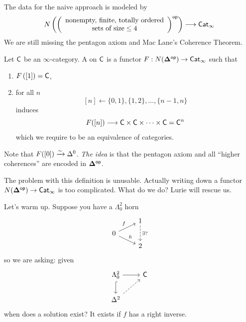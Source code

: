 	The data for the naive approach is modeled by
	\[
		N\left( \left(
				\begin{array}{c}
					\text{nonempty, finite, totally ordered} \\
					\text{sets of size} \le 4
		\end{array}\right) \op \right) \to \cat{Cat}_{\infty}
	\]
	We are still missing the pentagon axiom and Mac Lane's Coherence Theorem.

	\begin{definition}
		Let $\mathsf{C}$ be an $\infty$-category. A  on $\mathsf{C}$ is a functor
		$F:N(\bb{\Delta}\op)\to \cat{Cat}_\infty$ such that
	\begin{enumerate}[1)]
		\item $F\left( [1] \right) = \mathsf{C}$,
		\item for all $n $
			\[
				[n] \leftarrow \{0,1\} , \{1,2\} , \dots, \{n-1, n\}
			\]
			induces
			\[
				F([n]) \to \C\times \C\times \dots\times \C = \C^{n}
			\]
			which we require to be an equivalence of categories.
	\end{enumerate}
\end{definition}
Note that $F([0]) \xrightarrow{\sim} \Delta^{0}$. \emph{The idea} is that the pentagon axiom and all
``higher coherences'' are encoded in $\mathbf{\Delta}^\mathsf{op}$.

The problem with this definition is unusable. Actually writing down a functor
$N(\bb{\Delta}\op)\to \cat{Cat}_\infty$ is too complicated. What do we do? Lurie will rescue us.

Let's warm up. Suppose you have a $\Lambda^2_0$ horn
\[
	\begin{tikzcd}[row sep=tiny]
		& 1 \ar[dd,dashed,"\exists ?"] \\
		0 \ar[ur,"f"] \ar[dr,"h"] \\
		& 2
	\end{tikzcd}
\]
so we are asking: given
\[
	\begin{tikzcd}
		\Lambda_0^{2} \ar[r] \ar[d,hook] & \C \\
		\Delta^2 \ar[ur,dashed]
	\end{tikzcd}
\]
when does a solution exist? It exists if $f$ has a right inverse.

